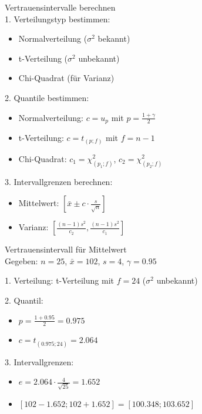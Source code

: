 \begin{KR}{Vertrauensintervalle berechnen}\\
1. Verteilungstyp bestimmen:
   \begin{itemize}
     \item Normalverteilung ($\sigma^2$ bekannt)
     \item t-Verteilung ($\sigma^2$ unbekannt)
     \item Chi-Quadrat (für Varianz)
   \end{itemize}

2. Quantile bestimmen:
   \begin{itemize}
     \item Normalverteilung: $c=u_p$ mit $p=\frac{1+\gamma}{2}$
     \item t-Verteilung: $c=t_{(p;f)}$ mit $f=n-1$
     \item Chi-Quadrat: $c_1=\chi^2_{(p_1;f)}$, $c_2=\chi^2_{(p_2;f)}$
   \end{itemize}

3. Intervallgrenzen berechnen:
   \begin{itemize}
     \item Mittelwert: $[\bar{x} \pm c \cdot \frac{s}{\sqrt{n}}]$
     \item Varianz: $[\frac{(n-1)s^2}{c_2}, \frac{(n-1)s^2}{c_1}]$
   \end{itemize}
\end{KR}

\begin{example2}{Vertrauensintervall für Mittelwert}\\
Gegeben: $n=25$, $\bar{x}=102$, $s=4$, $\gamma=0.95$

1. Verteilung: t-Verteilung mit $f=24$ ($\sigma^2$ unbekannt)

2. Quantil:
   \begin{itemize}
     \item $p=\frac{1+0.95}{2}=0.975$
     \item $c=t_{(0.975;24)}=2.064$
   \end{itemize}

3. Intervallgrenzen:
   \begin{itemize}
     \item $e=2.064 \cdot \frac{4}{\sqrt{25}}=1.652$
     \item $[102-1.652; 102+1.652]=[100.348; 103.652]$
   \end{itemize}
\end{example2}


